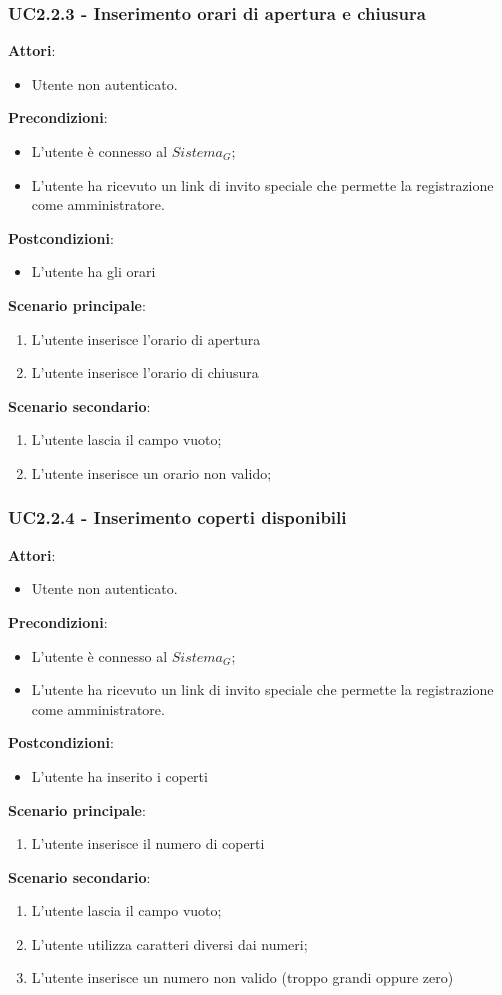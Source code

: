 \subsubsection{UC2.2.3 - Inserimento orari di apertura e chiusura}\label{usecase:2_2_3}
\textbf{Attori}:
\begin{itemize}
    \item Utente non autenticato.
\end{itemize}
\textbf{Precondizioni}:
\begin{itemize}
    \item L'utente è connesso al $\textit{Sistema}_G$;
    \item L'utente ha ricevuto un link di invito speciale che permette la registrazione come amministratore.
\end{itemize}
\textbf{Postcondizioni}:
\begin{itemize}
    \item L'utente ha gli orari
\end{itemize}
\textbf{Scenario principale}:
\begin{enumerate}
    \item L'utente inserisce l'orario di apertura
    \item L'utente inserisce l'orario di chiusura
\end{enumerate}
\textbf{Scenario secondario}:
\begin{enumerate}
    \item L'utente lascia il campo vuoto;
    \item L'utente inserisce un orario non valido;
\end{enumerate}
\subsubsection{UC2.2.4 - Inserimento coperti disponibili}\label{usecase:2_2_4}
\textbf{Attori}:
\begin{itemize}
    \item Utente non autenticato.
\end{itemize}
\textbf{Precondizioni}:
\begin{itemize}
    \item L'utente è connesso al $\textit{Sistema}_G$;
    \item L'utente ha ricevuto un link di invito speciale che permette la registrazione come amministratore.
\end{itemize}
\textbf{Postcondizioni}:
\begin{itemize}
    \item L'utente ha inserito i coperti
\end{itemize}
\textbf{Scenario principale}:
\begin{enumerate}
    \item L'utente inserisce il numero di coperti
\end{enumerate}
\textbf{Scenario secondario}:
\begin{enumerate}
    \item L'utente lascia il campo vuoto;
    \item L'utente utilizza caratteri diversi dai numeri;
    \item L'utente inserisce un numero non valido (troppo grandi oppure zero)
\end{enumerate}
